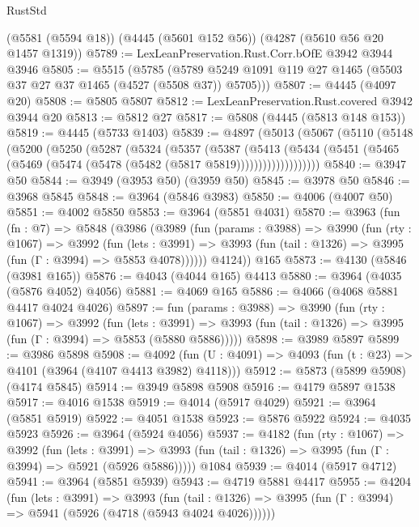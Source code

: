 \begin{lexlean}{RustStd}
\begin{coremodule}
    (@5581 (@5594 @18))
    (@4445 (@5601 @152 @56))
    (@4287 (@5610 @56 @20 @1457 @1319))
@5789 := LexLeanPreservation.Rust.Corr.bOfE @3942 @3944 @3946
@5805 := @5515
    (@5785 (@5789 @5249 @1091 @119 @27 @1465 (@5503 @37 @27 @37 @1465 (@4527 (@5508 @37)) @5705)))
@5807 := @4445 (@4097 @20)
@5808 := @5805 @5807
@5812 := LexLeanPreservation.Rust.covered @3942 @3944 @20
@5813 := @5812 @27
@5817 := @5808 (@4445 (@5813 @148 @153))
@5819 := @4445 (@5733 @1403)
@5839 := @4897
    (@5013
      (@5067
        (@5110
          (@5148
            (@5200
              (@5250
                (@5287
                  (@5324
                    (@5357
                      (@5387
                        (@5413
                          (@5434
                            (@5451
                              (@5465 (@5469 (@5474 (@5478 (@5482 (@5817 @5819)))))))))))))))))))
@5840 := @3947 @50
@5844 := @3949 (@3953 @50) (@3959 @50)
@5845 := @3978 @50
@5846 := @3968 @5845
@5848 := @3964 (@5846 @3983)
@5850 := @4006 (@4007 @50)
@5851 := @4002 @5850
@5853 := @3964 (@5851 @4031)
@5870 := @3963
    (fun (fn : @7) =>
    @5848
      (@3986
        (@3989
          (fun (params : @3988) =>
          @3990
            (fun (rty : @1067) =>
            @3992
              (fun (lets : @3991) =>
              @3993 (fun (tail : @1326) => @3995 (fun (Γ : @3994) => @5853 @4078))))))
        @4124))
    @165
@5873 := @4130 (@5846 (@3981 @165))
@5876 := @4043 (@4044 @165) @4413
@5880 := @3964 (@4035 (@5876 @4052) @4056)
@5881 := @4069 @165
@5886 := @4066 (@4068 @5881 @4417 @4024 @4026)
@5897 := fun (params : @3988) =>
  @3990
    (fun (rty : @1067) =>
    @3992
      (fun (lets : @3991) =>
      @3993 (fun (tail : @1326) => @3995 (fun (Γ : @3994) => @5853 (@5880 @5886)))))
@5898 := @3989 @5897
@5899 := @3986 @5898
@5908 := @4092 (fun (U : @4091) => @4093 (fun (t : @23) => @4101 (@3964 (@4107 @4413 @3982) @4118)))
@5912 := @5873 (@5899 @5908) (@4174 @5845)
@5914 := @3949 @5898 @5908
@5916 := @4179 @5897 @1538
@5917 := @4016 @1538
@5919 := @4014 (@5917 @4029)
@5921 := @3964 (@5851 @5919)
@5922 := @4051 @1538
@5923 := @5876 @5922
@5924 := @4035 @5923
@5926 := @3964 (@5924 @4056)
@5937 := @4182
    (fun (rty : @1067) =>
    @3992
      (fun (lets : @3991) =>
      @3993 (fun (tail : @1326) => @3995 (fun (Γ : @3994) => @5921 (@5926 @5886)))))
    @1084
@5939 := @4014 (@5917 @4712)
@5941 := @3964 (@5851 @5939)
@5943 := @4719 @5881 @4417
@5955 := @4204
    (fun (lets : @3991) =>
    @3993
      (fun (tail : @1326) => @3995 (fun (Γ : @3994) => @5941 (@5926 (@4718 (@5943 @4024 @4026))))))

\end{coremodule}
\end{lexlean}

